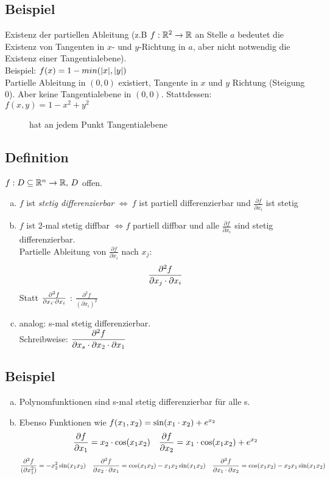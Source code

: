 \subsection{Beispiel}
Existenz der partiellen Ableitung (z.B $f: \mathbb{R}^2 \to \mathbb{R}$ an Stelle $a$ bedeutet die Existenz von Tangenten in $x$- und $y$-Richtung in $a$, aber nicht notwendig die Existenz einer Tangentialebene).\\
Beispiel: $f(x) = 1 - min(\lvert x \rvert, \lvert y \rvert)$\\
Partielle Ableitung in $(0,0)$ existiert, Tangente in $x$ und $y$ Richtung (Steigung 0). Aber keine Tangentialebene in $(0,0)$. Stattdessen:\\
$f(x,y) = 1 - x^2 + y^2$
\begin{figure}[h!]
\centering
{}
\caption{hat an jedem Punkt Tangentialebene}
\end{figure}
\subsection{Definition}
$f: D \subseteq \mathbb{R}^n \to \mathbb{R},\,D$ offen.
\begin{enumerate}[a)]
\item $f$ ist \emph{stetig differenzierbar} $\Leftrightarrow\ f$ ist partiell differenzierbar und $\frac{\partial f}{\partial x_i}$ ist stetig
\item $f$ ist 2-mal stetig diffbar $\Leftrightarrow f$ partiell diffbar und alle $\frac{\partial f}{\partial x_i}$ sind stetig differenzierbar.\\
Partielle Ableitung von $\frac{\partial f}{\partial x_i}$ nach $x_j$:
\[\frac{\partial^2 f}{\partial x_j \cdot \partial x_i} \]
Statt $\frac{\partial^2 f}{\partial x_i \cdot \partial x_i}$ : $\frac{\partial^2 f}{(\partial x_i)^2}$
\item analog: s-mal stetig differenzierbar.\\
Schreibweise: $\dfrac{\partial^2 f}{\partial x_s  \cdot \partial x_2 \cdot \partial x_1}$
\end{enumerate}
\subsection{Beispiel}\label{sec:\thesubsection}
\begin{enumerate}[a)]
\item Polynomfunktionen sind s-mal stetig differenzierbar für alle s.
\item Ebenso Funktionen wie $f(x_1,x_2) = \sin(x_1\cdot x_2) + e^{x_2}$
\[ \frac{\partial f}{\partial x_1} = x_2 \cdot \cos(x_1x_2)  \quad \frac{\partial f}{\partial x_2} = x_1 \cdot \cos(x_1x_2) + e^{x_2}  \]
\[ \frac{\partial^2 f}{(\partial x_1^2)} = -x_2^2\sin(x_1x_2) \quad \frac{\partial^2 f}{\partial x_2 \cdot \partial x_1} =  \cos(x_1x_2) - x_1x_2 \sin(x_1x_2) \quad 
\frac{\partial^2 f}{\partial x_1 \cdot \partial x_2} =  \cos(x_1x_2) - x_2x_1 \sin(x_1x_2) \]
\end{enumerate}
